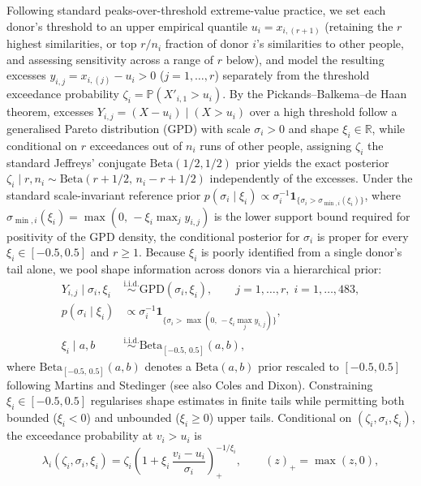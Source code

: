 \documentclass[11pt,a4paper]{article}
\begin{document}
Following standard peaks-over-threshold extreme-value practice\cite{coles2001}, we set each donor's threshold to an upper empirical quantile $u_i = x_{i,(r+1)}$ (retaining the $r$ highest similarities, or top $r/n_i$ fraction of donor $i$'s similarities to other people, and assessing sensitivity across a range of $r$ below), and model the resulting excesses $y_{i,j} = x_{i,(j)} - u_i > 0$ ($j = 1, \dots, r$) separately from the threshold exceedance probability $\zeta_i = \mathbb{P}(X'_{i,1} > u_i)$. By the Pickands--Balkema--de Haan theorem\cite{coles2001}, excesses $Y_{i,j} = (X - u_i) \mid (X > u_i)$ over a high threshold follow a generalised Pareto distribution (GPD) with scale $\sigma_i > 0$ and shape $\xi_i \in \mathbb{R}$, while conditional on $r$ exceedances out of $n_i$ runs of other people, assigning $\zeta_i$ the standard Jeffreys' conjugate $\mathrm{Beta}(1/2, 1/2)$ prior yields the exact posterior $\zeta_i \mid r, n_i \sim \mathrm{Beta}(r + 1/2,\, n_i - r + 1/2)$ independently of the excesses. Under the standard scale-invariant reference prior $p(\sigma_i \mid \xi_i) \propto \sigma_i^{-1}\mathbf{1}_{\{\sigma_i > \sigma_{\min,i}(\xi_i)\}}$, where $\sigma_{\min,i}(\xi_i) = \max(0,\, -\xi_i \max_j y_{i,j})$ is the lower support bound required for positivity of the GPD density, the conditional posterior for $\sigma_i$ is proper for every $\xi_i \in [-0.5, 0.5]$ and $r \ge 1$. Because $\xi_i$ is poorly identified from a single donor's tail alone, we pool shape information across donors via a hierarchical prior\cite{cooley2007}:
\begin{align*}
    Y_{i,j} \mid \sigma_i, \xi_i &\stackrel{\mathrm{i.i.d.}}{\sim} \mathrm{GPD}(\sigma_i, \xi_i), \qquad j = 1, \dots, r,\; i = 1, \dots, 483, \\
    p(\sigma_i \mid \xi_i) &\propto \sigma_i^{-1}\mathbf{1}_{\{\sigma_i > \max(0,\, -\xi_i \max_j y_{i,j})\}}, \\
    \xi_i \mid a, b &\stackrel{\mathrm{i.i.d.}}{\sim} \mathrm{Beta}_{[-0.5,\,0.5]}(a, b),
\end{align*}
where $\mathrm{Beta}_{[-0.5,\,0.5]}(a, b)$ denotes a $\mathrm{Beta}(a, b)$ prior rescaled to $[-0.5, 0.5]$ following Martins and Stedinger\cite{martins2000} (see also Coles and Dixon\cite{coles1999}). Constraining $\xi_i \in [-0.5, 0.5]$ regularises shape estimates in finite tails while permitting both bounded ($\xi_i < 0$) and unbounded ($\xi_i \ge 0$) upper tails. Conditional on $(\zeta_i, \sigma_i, \xi_i)$, the exceedance probability at $v_i > u_i$ is
\[
    \lambda_i(\zeta_i, \sigma_i, \xi_i) = \zeta_i\left(1 + \xi_i\,\frac{v_i - u_i}{\sigma_i}\right)_{+}^{-1/\xi_i}, \qquad (z)_{+} = \max(z, 0),
\]
\end{document}
